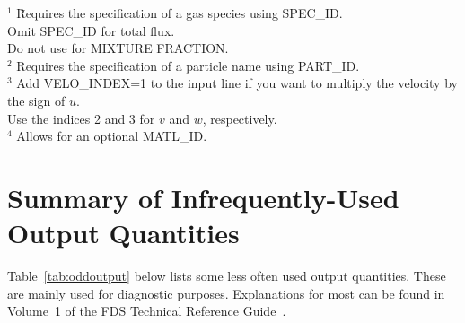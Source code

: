 \documentclass[11pt]{book}
\begin{document}
\noindent
\begin{tabbing}
$^1$  \hspace{0.05in} \= Requires the specification of a gas species using {\ct SPEC\_ID}. \\
                      \> Omit {\ct SPEC\_ID} for total flux. \\
                      \> Do not use for {\ct MIXTURE FRACTION}. \\
$^2$                  \> Requires the specification of a particle name using {\ct PART\_ID}. \\
$^3$                  \> Add {\ct VELO\_INDEX=1} to the input line if you want to multiply the velocity by the sign of $u$. \\
                      \> Use the indices 2 and 3 for $v$ and $w$, respectively.\\
$^4$                  \> Allows for an optional {\ct MATL\_ID}.

\end{tabbing}

\clearpage

\section{Summary of Infrequently-Used Output Quantities}
\label{info:oddoutputquantities}

Table~\ref{tab:oddoutput} below lists some less often used output quantities. These are mainly used for diagnostic purposes. Explanations for most can
be found in Volume~1 of the FDS Technical Reference Guide~\cite{FDS_Math_Guide}.
\end{document}

